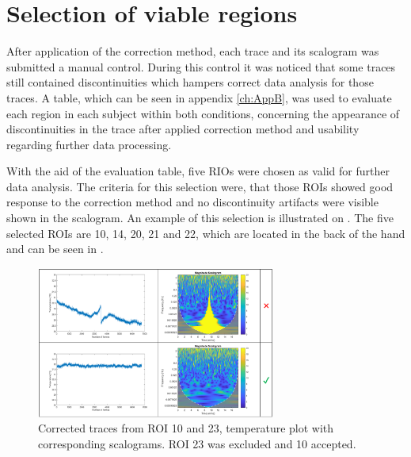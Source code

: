 \section{Selection of viable regions}

After application of the correction method, each trace and its scalogram was submitted a manual control. During this control it was noticed that some traces still contained discontinuities which hampers correct data analysis for those traces. A table, which can be seen in appendix \ref{ch:AppB}, was used to evaluate each region in each subject within both conditions, concerning the appearance of discontinuities in the trace after applied correction method and usability regarding further data processing.

With the aid of the evaluation table, five RIOs were chosen as valid for further data analysis. The criteria for this selection were, that those ROIs showed good response to the correction method and no discontinuity artifacts were visible shown in the scalogram. An example of this selection is illustrated on . The five selected ROIs are 10, 14, 20, 21 and 22, which are located in the back of the hand and can be seen in .

\begin{figure}[H]
	\includegraphics[width=0.7\textwidth]{figures/ROI_selection}
	\caption{Corrected traces from ROI 10 and 23, temperature plot with corresponding scalograms. ROI 23 was excluded and 10 accepted.}
	\label{fig:selection}
\end{figure} 